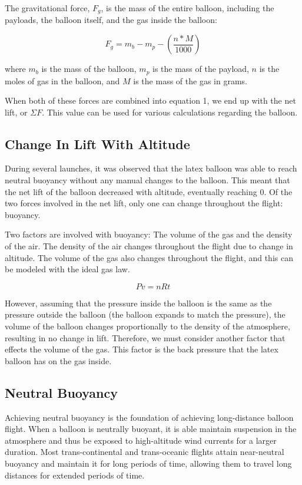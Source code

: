 \documentclass[usenatbib]{mn2e}
\newcommand{\f}[2]{\frac{#1}{#2}}
\begin{document}
The gravitational force, $F_g$, is the mass of the entire balloon, including the payloads, the balloon itself, and the gas inside the balloon:

\begin{equation}
F_{g}=m_b-m_p-(\f{n*M}{1000})
\end{equation}

where $m_b$ is the mass of the balloon, $m_p$ is the mass of the payload, $n$ is the moles of gas in the balloon, and $M$ is the mass of the gas in grams.

When both of these forces are combined into equation 1, we end up with the net lift, or $\Sigma F$. This value can be used for various calculations regarding the balloon. 

\subsection{Change In Lift With Altitude}
\label{sec:backpressure}

During several launches, it was observed that the latex balloon was able to reach neutral buoyancy without any manual changes to the balloon. This meant that the net lift of the balloon decreased with altitude, eventually reaching 0. Of the two forces involved in the net lift, only one can change throughout the flight: buoyancy.

Two factors are involved with buoyancy: The volume of the gas and the density of the air. The density of the air changes throughout the flight due to change in altitude. The volume of the gas also changes throughout the flight, and this can be modeled with the ideal gas law. 

\begin{equation}
Pv=nRt
\end{equation}

However, assuming that the pressure inside the balloon is the same as the pressure outside the balloon (the balloon expands to match the pressure), the volume of the balloon changes proportionally to the density of the atmosphere, resulting in no change in lift. Therefore, we must consider another factor that effects the volume of the gas. This factor is the back pressure that the latex balloon has on the gas inside. 

\subsection{Neutral Buoyancy}

Achieving neutral buoyancy is the foundation of achieving long-distance balloon flight. When a balloon is neutrally buoyant, it is able maintain suspension in the atmosphere and thus be exposed to high-altitude wind currents for a larger duration. Most trans-continental and trans-oceanic flights attain near-neutral buoyancy and maintain it for long periods of time, allowing them to travel long distances for extended periods of time.
\end{document}
